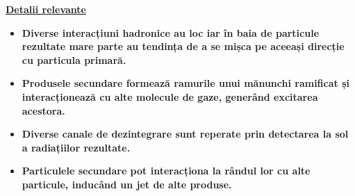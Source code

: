 \documentclass[10pt]{beamer}
\begin{document}
\begin{frame}{\textbf{\underline{Detalii relevante}}}
  
\vspace{-2.5cm}

  \begin{itemize}
    \small
      \item[\ding{55}] \textbf{ Diverse interacțiuni hadronice au loc iar în baia de particule rezultate mare parte au tendința de a se mișca pe aceeași direcție cu particula primară.} \\
      
      \item[\ding{55}] \textbf{ Produsele secundare formează ramurile unui mănunchi ramificat și interacționează cu alte molecule de gaze, generând excitarea acestora.}\\
     
     \item[\ding{55}] \textbf{ Diverse canale de dezintegrare sunt reperate prin detectarea la sol a radiațiilor rezultate.}

     \item[\ding{55}] \textbf{ Particulele secundare pot interacționa la rândul lor cu alte particule, inducând un jet de alte produse.}
   
  \end{itemize}
 


\end{frame}
\end{document}
